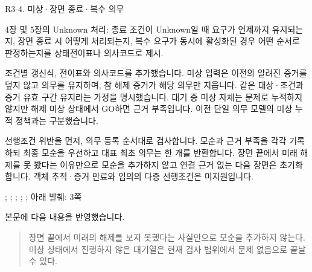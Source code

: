 \begin{reviewitem}{R3-4. 미상·장면 종료·복수 의무}

\begin{reviewercomment}

4장 및 5장의 Unknown 처리: 종료 조건이 Unknown일 때 요구가 언제까지 유지되는지, 장면 종료 시 어떻게 처리되는지, 복수 요구가 동시에 활성화된 경우 어떤 순서로 판정하는지를 상태전이표나 의사코드로 제시.

\end{reviewercomment}

\begin{authorresponse}

조건별 갱신식, 전이표와 의사코드를 추가했습니다. 미상 입력은 이전의 알려진 증거를 덮지 않고 의무를 유지하며, 참 해제 증거가 해당 의무만 지웁니다. 같은 대상·조건과 증거 유효 구간 유지라는 가정을 명시했습니다. 대기 중 미상 자체는 문제로 누적하지 않지만 해제 미상 상태에서 GO하면 근거 부족입니다. 이전 단일 의무 모델의 미상 누적 정책과는 구분했습니다.

선행조건 위반을 먼저, 의무 등록 순서대로 검사합니다. 모순과 근거 부족을 각각 기록하되 최종 모순을 우선하고 대표 최초 의무는 한 개를 반환합니다. 장면 끝에서 미래 해제를 못 봤다는 이유만으로 모순을 추가하지 않고 연결 근거 없는 다음 장면은 초기화합니다. 객체 추적·증거 만료와 임의의 다중 선행조건은 미지원입니다.

\end{authorresponse}

\begin{manuscriptrevision}{; ; ; ; ; 아래 발췌: 3쪽}

본문에 다음 내용을 반영했습니다.

\begin{quote}

장면 끝에서 미래의 해제를 보지 못했다는 사실만으로 모순을 추가하지 않는다. 미상 상태에서 진행하지 않은 대기열은 현재 검사 범위에서 문제 없음으로 끝날 수 있다.

\end{quote}

\end{manuscriptrevision}

\end{reviewitem}

\clearpage

